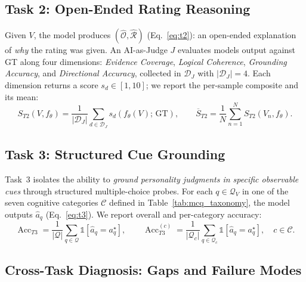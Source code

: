 \documentclass{article}
\begin{document}
\subsection{Task 2: Open-Ended Rating Reasoning}
\label{sec:task2}

Given $V$, the model produces $(\hat{\mathcal{O}}, \hat{\mathcal{R}})$ (Eq.~\ref{eq:t2}): an open-ended explanation of \emph{why} the rating was given. An AI-as-Judge $J$ evaluates models output against GT along four dimensions: \emph{Evidence Coverage}, \emph{Logical Coherence}, \emph{Grounding Accuracy}, and \emph{Directional Accuracy}, collected in $\mathcal{D}_{\!J}$ with $|\mathcal{D}_{\!J}|=4$. Each dimension returns a score $s_d \in [1,10]$; we report the per-sample composite and its mean:
\vspace{-0.2cm}
\begin{equation}
S_{T2}(V, f_\theta) = \frac{1}{|\mathcal{D}_{\!J}|}\sum_{d \in \mathcal{D}_{\!J}} s_d\!\left(f_\theta(V);\, \text{GT}\right),
\qquad
\overline{S}_{T2} = \frac{1}{N}\sum_{n=1}^{N} S_{T2}(V_n, f_\theta).
\label{eq:t2_avg4}
\end{equation}
\vspace{-0.7cm}

\subsection{Task 3: Structured Cue Grounding}
\label{sec:task3}

Task~3 isolates the ability to \emph{ground personality judgments in specific observable cues} through structured multiple-choice probes. For each $q\!\in\!\mathcal{Q}_V$ in one of the seven cognitive categories $\mathcal{C}$ defined in Table~\ref{tab:mcq_taxonomy}, the model outputs $\hat{a}_q$ (Eq.~\ref{eq:t3}). We report overall and per-category accuracy:
\begin{equation}
\operatorname{Acc}_{T3} = \frac{1}{|\mathcal{Q}|}\sum_{q\in\mathcal{Q}} \mathbb{1}[\hat{a}_q = a_q^\star],
\qquad
\operatorname{Acc}_{T3}^{(c)} = \frac{1}{|\mathcal{Q}_c|}\sum_{q\in\mathcal{Q}_c} \mathbb{1}[\hat{a}_q = a_q^\star], \quad c\in\mathcal{C}.
\label{eq:t3_metrics}
\end{equation}
\vspace{-0.7cm}

\subsection{Cross-Task Diagnosis: Gaps and Failure Modes}
\label{sec:cross_task}\label{sec:failure_modes}
\end{document}
